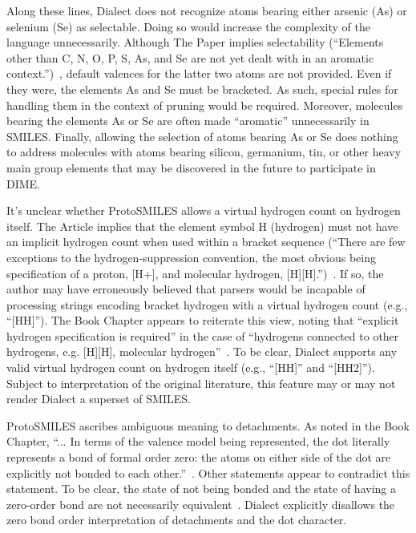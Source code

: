 \documentclass{article}
\begin{document}
Along these lines, Dialect does not recognize atoms bearing either arsenic (As) or selenium (Se) as selectable. Doing so would increase the complexity of the language unnecessarily. Although The Paper implies selectability (\enquote{Elements other than C, N, O, P, S, As, and Se are not yet dealt with in an aromatic context.})~\cite[p.~35]{weininger:1988}, default valences for the latter two atoms are not provided. Even if they were, the elements As and Se must be bracketed. As such, special rules for handling them in the context of pruning would be required. Moreover, molecules bearing the elements As or Se are often made \enquote{aromatic} unnecessarily in SMILES. Finally, allowing the selection of atoms bearing As or Se does nothing to address molecules with atoms bearing silicon, germanium, tin, or other heavy main group elements that may be discovered in the future to participate in DIME.

It's unclear whether ProtoSMILES allows a virtual hydrogen count on hydrogen itself. The Article implies that the element symbol H (hydrogen) must not have an implicit hydrogen count when used within a bracket sequence (\enquote{There are few exceptions to the hydrogen-suppression convention, the most obvious being specification of a proton, [H+], and molecular hydrogen, [H][H].})~\cite[p.~34]{weininger:1988}. If so, the author may have erroneously believed that parsers would be incapable of processing strings encoding bracket hydrogen with a virtual hydrogen count (e.g., \enquote{[HH]}). The Book Chapter appears to reiterate this view, noting that \enquote{explicit hydrogen specification is required} in the case of \enquote{hydrogens connected to other hydrogens, e.g. [H][H], molecular hydrogen}~\cite[p.~97]{weininger:2003}. To be clear, Dialect supports any valid virtual hydrogen count on hydrogen itself (e.g., \enquote{[HH]} and \enquote{[HH2]}). Subject to interpretation of the original literature, this feature may or may not render Dialect a superset of SMILES.

ProtoSMILES ascribes ambiguous meaning to detachments. As noted in the Book Chapter, \enquote{... In terms of the valence model being represented, the dot literally represents a bond of formal order zero: the atoms on either side of the dot are explicitly not bonded to each other.}~\cite[p.~88]{weininger:2003}. Other statements appear to contradict this statement. To be clear, the state of not being bonded and the state of having a zero-order bond are not necessarily equivalent~\cite{clark:2011}. Dialect explicitly disallows the zero bond order interpretation of detachments and the dot character.
\end{document}
